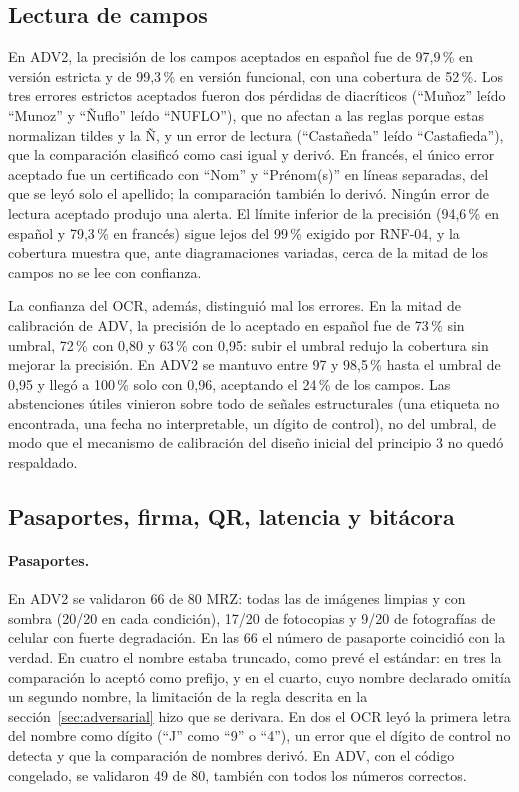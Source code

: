 \documentclass[11pt,a4paper]{article}
\begin{document}
\subsection{Lectura de campos}
\label{sec:lectura}
En ADV2, la precisión de los campos aceptados en español fue de 97,9\,\% en versión estricta y de 99,3\,\% en versión funcional, con una cobertura de 52\,\%. Los tres errores estrictos aceptados fueron dos pérdidas de diacríticos (``Muñoz'' leído ``Munoz'' y ``Ñuflo'' leído ``NUFLO''), que no afectan a las reglas porque estas normalizan tildes y la Ñ, y un error de lectura (``Castañeda'' leído ``Castafieda''), que la comparación clasificó como casi igual y derivó. En francés, el único error aceptado fue un certificado con ``Nom'' y ``Prénom(s)'' en líneas separadas, del que se leyó solo el apellido; la comparación también lo derivó. Ningún error de lectura aceptado produjo una alerta. El límite inferior de la precisión (94,6\,\% en español y 79,3\,\% en francés) sigue lejos del 99\,\% exigido por RNF-04, y la cobertura muestra que, ante diagramaciones variadas, cerca de la mitad de los campos no se lee con confianza.

La confianza del OCR, además, distinguió mal los errores. En la mitad de calibración de ADV, la precisión de lo aceptado en español fue de 73\,\% sin umbral, 72\,\% con 0,80 y 63\,\% con 0,95: subir el umbral redujo la cobertura sin mejorar la precisión. En ADV2 se mantuvo entre 97 y 98,5\,\% hasta el umbral de 0,95 y llegó a 100\,\% solo con 0,96, aceptando el 24\,\% de los campos. Las abstenciones útiles vinieron sobre todo de señales estructurales (una etiqueta no encontrada, una fecha no interpretable, un dígito de control), no del umbral, de modo que el mecanismo de calibración del diseño inicial del principio 3 no quedó respaldado.

\subsection{Pasaportes, firma, QR, latencia y bitácora}
\paragraph{Pasaportes.} En ADV2 se validaron 66 de 80 MRZ: todas las de imágenes limpias y con sombra (20/20 en cada condición), 17/20 de fotocopias y 9/20 de fotografías de celular con fuerte degradación. En las 66 el número de pasaporte coincidió con la verdad. En cuatro el nombre estaba truncado, como prevé el estándar: en tres la comparación lo aceptó como prefijo, y en el cuarto, cuyo nombre declarado omitía un segundo nombre, la limitación de la regla descrita en la sección~\ref{sec:adversarial} hizo que se derivara. En dos el OCR leyó la primera letra del nombre como dígito (``J'' como ``9'' o ``4''), un error que el dígito de control no detecta y que la comparación de nombres derivó. En ADV, con el código congelado, se validaron 49 de 80, también con todos los números correctos.
\end{document}
